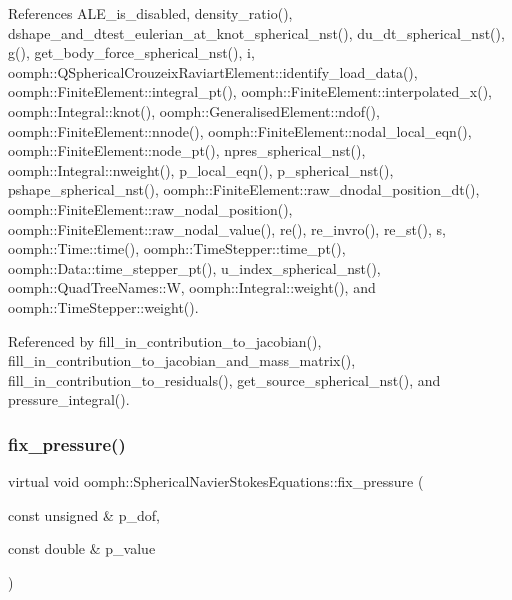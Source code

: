 References A\+L\+E\+\_\+is\+\_\+disabled, density\+\_\+ratio(), dshape\+\_\+and\+\_\+dtest\+\_\+eulerian\+\_\+at\+\_\+knot\+\_\+spherical\+\_\+nst(), du\+\_\+dt\+\_\+spherical\+\_\+nst(), g(), get\+\_\+body\+\_\+force\+\_\+spherical\+\_\+nst(), i, oomph\+::\+Q\+Spherical\+Crouzeix\+Raviart\+Element\+::identify\+\_\+load\+\_\+data(), oomph\+::\+Finite\+Element\+::integral\+\_\+pt(), oomph\+::\+Finite\+Element\+::interpolated\+\_\+x(), oomph\+::\+Integral\+::knot(), oomph\+::\+Generalised\+Element\+::ndof(), oomph\+::\+Finite\+Element\+::nnode(), oomph\+::\+Finite\+Element\+::nodal\+\_\+local\+\_\+eqn(), oomph\+::\+Finite\+Element\+::node\+\_\+pt(), npres\+\_\+spherical\+\_\+nst(), oomph\+::\+Integral\+::nweight(), p\+\_\+local\+\_\+eqn(), p\+\_\+spherical\+\_\+nst(), pshape\+\_\+spherical\+\_\+nst(), oomph\+::\+Finite\+Element\+::raw\+\_\+dnodal\+\_\+position\+\_\+dt(), oomph\+::\+Finite\+Element\+::raw\+\_\+nodal\+\_\+position(), oomph\+::\+Finite\+Element\+::raw\+\_\+nodal\+\_\+value(), re(), re\+\_\+invro(), re\+\_\+st(), s, oomph\+::\+Time\+::time(), oomph\+::\+Time\+Stepper\+::time\+\_\+pt(), oomph\+::\+Data\+::time\+\_\+stepper\+\_\+pt(), u\+\_\+index\+\_\+spherical\+\_\+nst(), oomph\+::\+Quad\+Tree\+Names\+::W, oomph\+::\+Integral\+::weight(), and oomph\+::\+Time\+Stepper\+::weight().



Referenced by fill\+\_\+in\+\_\+contribution\+\_\+to\+\_\+jacobian(), fill\+\_\+in\+\_\+contribution\+\_\+to\+\_\+jacobian\+\_\+and\+\_\+mass\+\_\+matrix(), fill\+\_\+in\+\_\+contribution\+\_\+to\+\_\+residuals(), get\+\_\+source\+\_\+spherical\+\_\+nst(), and pressure\+\_\+integral().

\mbox{\label{classoomph_1_1SphericalNavierStokesEquations_ae4dc4c80f271ed2b31296f01862dc536}} 
\subsubsection{\texorpdfstring{fix\+\_\+pressure()}{fix\_pressure()}}
{\footnotesize\ttfamily virtual void oomph\+::\+Spherical\+Navier\+Stokes\+Equations\+::fix\+\_\+pressure (\begin{DoxyParamCaption}\item[{const unsigned \&}]{p\+\_\+dof,  }\item[{const double \&}]{p\+\_\+value }\end{DoxyParamCaption})\hspace{0.3cm}{\ttfamily [pure virtual]}}



